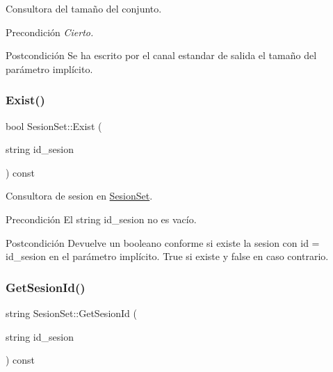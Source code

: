 Consultora del tamaño del conjunto. 

\begin{DoxyPrecond}{Precondición}
{\itshape Cierto.} 
\end{DoxyPrecond}
\begin{DoxyPostcond}{Postcondición}
Se ha escrito por el canal estandar de salida el tamaño del parámetro implícito. 
\end{DoxyPostcond}
\mbox{\label{class_sesion_set_a4e9002494d6532d3cdbd31172b8a08b0}} 
\subsubsection{\texorpdfstring{Exist()}{Exist()}}
{\footnotesize\ttfamily bool Sesion\+Set\+::\+Exist (\begin{DoxyParamCaption}\item[{string}]{id\+\_\+sesion }\end{DoxyParamCaption}) const}



Consultora de sesion en \mbox{\hyperlink{class_sesion_set}{Sesion\+Set}}. 

\begin{DoxyPrecond}{Precondición}
El string id\+\_\+sesion no es vacío. 
\end{DoxyPrecond}
\begin{DoxyPostcond}{Postcondición}
Devuelve un booleano conforme si existe la sesion con id = id\+\_\+sesion en el parámetro implícito. True si existe y false en caso contrario. 
\end{DoxyPostcond}
\mbox{\label{class_sesion_set_a0c84ef607240e540fd1bcaec68280636}} 
\subsubsection{\texorpdfstring{Get\+Sesion\+Id()}{GetSesionId()}}
{\footnotesize\ttfamily string Sesion\+Set\+::\+Get\+Sesion\+Id (\begin{DoxyParamCaption}\item[{string}]{id\+\_\+sesion }\end{DoxyParamCaption}) const}



